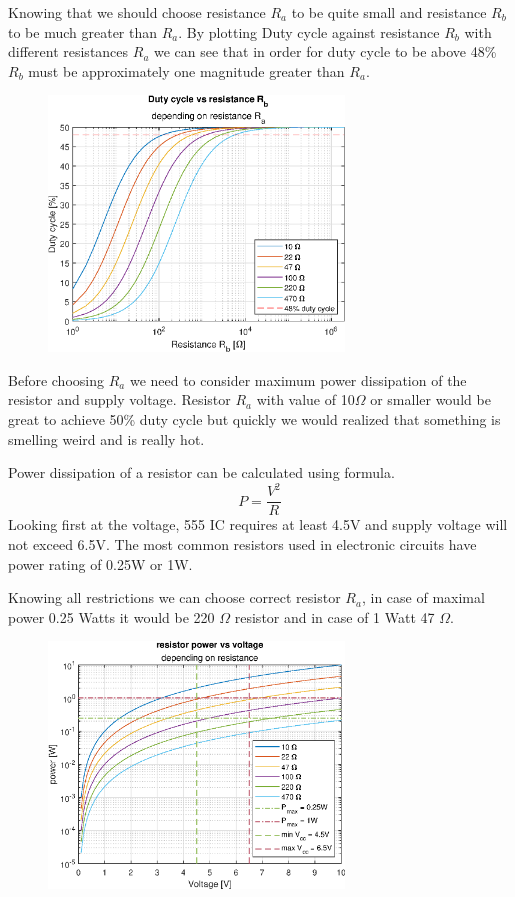 \documentclass[english,10pt,a4paper]{article}
\begin{document}
	Knowing that we should choose resistance $R_a$ to be quite small and resistance $R_b$ to be much greater than $R_a$. 
	By plotting Duty cycle against resistance $R_b$ with different resistances $R_a$ we can see that in order for duty cycle to be above 48\% $R_b$ must be approximately one magnitude greater than $R_a$.
	
	\begin{figure}[H]
		\centering
		\includegraphics[width=0.7\textwidth]{img/dc_plot.eps}
	\end{figure}
	
	Before choosing $R_a$ we need to consider maximum power dissipation of the resistor and supply voltage. Resistor $R_a$ with value of 10$\Omega$ or smaller would be great to achieve 50\% duty cycle but quickly we would realized that something is smelling weird and is really hot.
	
	Power dissipation of a resistor can be calculated using formula.
	\begin{equation}
		P = \frac{V^2}{R}
	\end{equation}
	Looking first at the voltage, 555 IC requires at least 4.5V and supply voltage will not exceed 6.5V. The most common resistors used in electronic circuits have power rating of 0.25W or 1W.
	
	Knowing all restrictions we can choose correct resistor $R_a$, in case of maximal power 0.25 Watts it would be 220 $\Omega$ resistor and in case of 1 Watt 47 $\Omega$.
	
	\begin{figure}[H]
		\centering
		\includegraphics[width=0.7\textwidth]{img/pr_plot.eps}
	\end{figure}
\end{document}
